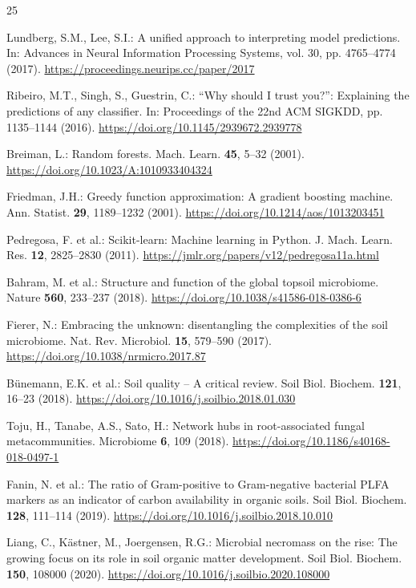 \documentclass[runningheads,a4paper,oribibl]{llncs}
\begin{document}
\begin{thebibliography}{25}

Lundberg, S.M., Lee, S.I.: A unified approach to interpreting model predictions. In: Advances in Neural Information Processing Systems, vol. 30, pp. 4765--4774 (2017). \url{https://proceedings.neurips.cc/paper/2017}

Ribeiro, M.T., Singh, S., Guestrin, C.: ``Why should I trust you?'': Explaining the predictions of any classifier. In: Proceedings of the 22nd ACM SIGKDD, pp. 1135--1144 (2016). \url{https://doi.org/10.1145/2939672.2939778}

Breiman, L.: Random forests. Mach. Learn. \textbf{45}, 5--32 (2001). \url{https://doi.org/10.1023/A:1010933404324}

Friedman, J.H.: Greedy function approximation: A gradient boosting machine. Ann. Statist. \textbf{29}, 1189--1232 (2001). \url{https://doi.org/10.1214/aos/1013203451}

Pedregosa, F. et al.: Scikit-learn: Machine learning in Python. J. Mach. Learn. Res. \textbf{12}, 2825--2830 (2011). \url{https://jmlr.org/papers/v12/pedregosa11a.html}

Bahram, M. et al.: Structure and function of the global topsoil microbiome. Nature \textbf{560}, 233--237 (2018). \url{https://doi.org/10.1038/s41586-018-0386-6}

Fierer, N.: Embracing the unknown: disentangling the complexities of the soil microbiome. Nat. Rev. Microbiol. \textbf{15}, 579--590 (2017). \url{https://doi.org/10.1038/nrmicro.2017.87}

Bünemann, E.K. et al.: Soil quality -- A critical review. Soil Biol. Biochem. \textbf{121}, 16--23 (2018). \url{https://doi.org/10.1016/j.soilbio.2018.01.030}

Toju, H., Tanabe, A.S., Sato, H.: Network hubs in root-associated fungal metacommunities. Microbiome \textbf{6}, 109 (2018). \url{https://doi.org/10.1186/s40168-018-0497-1}

Fanin, N. et al.: The ratio of Gram-positive to Gram-negative bacterial PLFA markers as an indicator of carbon availability in organic soils. Soil Biol. Biochem. \textbf{128}, 111--114 (2019). \url{https://doi.org/10.1016/j.soilbio.2018.10.010}

Liang, C., Kästner, M., Joergensen, R.G.: Microbial necromass on the rise: The growing focus on its role in soil organic matter development. Soil Biol. Biochem. \textbf{150}, 108000 (2020). \url{https://doi.org/10.1016/j.soilbio.2020.108000}


\end{thebibliography}
\end{document}
